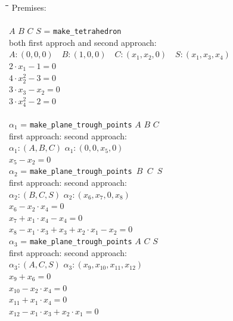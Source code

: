 \documentclass[final,1p,times,authoryear]{elsarticle}
\begin{document}
\begin{footnotesize}
\begin{tabbing}
\hspace{5mm}\=\hspace{1cm}\=\hspace{1cm}\=\hspace{6cm}\=\kill
Premises:\\
\\
\> $A$ $B$ $C$ $S$ = {\tt make\_tetrahedron} \\
  \>\> both first approch and second approach: \\
  \>\> $A: (0, 0, 0)$\ \ $B: (1, 0, 0)$\ \ $C: (x_1, x_2, 0)$\ \ $S: (x_1, x_3, x_4)$ \\
  \>\> $2\cdot x_1  - 1 = 0$ \\
  \>\> $4\cdot x_2^2  -3 = 0$ \\
  \>\> $3\cdot x_3  -  x_2 = 0$ \\
  \>\> $3\cdot x_4^2  -2 = 0$ \\ \\
\> $\alpha_1$ = {\tt make\_plane\_trough\_points} $A$ $B$ $C$ \\
\>\> first approach: \>\>second approach\footnotemark[14]: \\
 \>\> $\alpha_1: (A, B, C)$ \>\> $\alpha_1 : (0, 0, x_5, 0)$ \\
 \>\>\> \>$x_5  -  x_2 = 0$ \\
\> $\alpha_2$ = {\tt make\_plane\_trough\_points $B$ $C$ $S$} \\
\>\> first approach: \>\> second approach: \\
\>\> $\alpha_2: (B, C, S)$ \>\>$\alpha_2 : (x_6, x_7, 0, x_8)$ \\
 \>\> \>\>$x_6  -  x_2\cdot x_4 = 0$ \\
 \>\> \>\>$x_7  +  x_1\cdot x_4  -  x_4 = 0$ \\
 \>\> \>\>$x_8  -  x_1\cdot x_3  +  x_3  +  x_2\cdot x_1  -  x_2 = 0$ \\
\> $\alpha_3$ = {\tt make\_plane\_trough\_points} $A$ $C$ $S$ \\
\>\> first approach: \>\> second approach: \\
\>\> $\alpha_3: (A, C, S)$ \>\> $\alpha_3 : (x_9, x_{10}, x_{11}, x_{12})$ \\
  \>\> \>\> $x_9  +  x_6 = 0$ \\
  \>\> \>\> $x_{10}  -  x_2\cdot x_4 = 0$ \\
  \>\> \>\> $x_{11}  +  x_1\cdot x_4 = 0$ \\
  \>\> \>\> $x_{12}  -  x_1\cdot x_3  +  x_2\cdot x_1 = 0$ \\

\end{tabbing}
\end{footnotesize}
\end{document}
